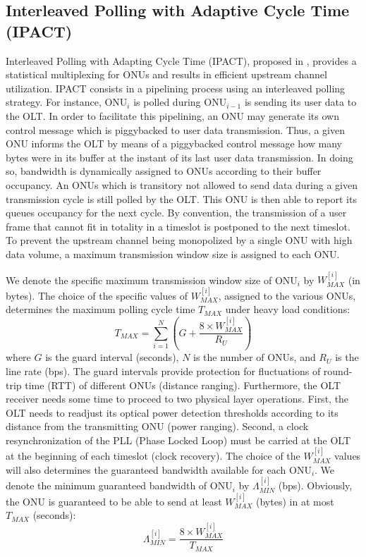 \documentclass[a4paper,10pt]{IEEEtran}
\begin{document}
\subsection{Interleaved Polling with Adaptive Cycle Time (IPACT)}
Interleaved Polling with Adapting Cycle Time (IPACT), proposed in
\cite{Kramer:IPACT}, provides a statistical multiplexing for ONUs
and results in efficient upstream channel utilization. IPACT
consists in a pipelining process using an interleaved polling
strategy. For instance, ONU$_{i}$ is polled during ONU$_{i-1}$ is
sending its user data to the OLT. In order to facilitate this
pipelining, an ONU may generate its own control message which is
piggybacked to user data transmission. Thus, a given ONU informs the
OLT by means of a piggybacked control message how many bytes were in
its buffer at the instant of its last user data transmission. In
doing so, bandwidth is dynamically assigned to ONUs according to
their buffer occupancy. An ONUs which is transitory not allowed to
send data during a given transmission cycle is still polled by the
OLT. This ONU is then able to report its queues occupancy for the
next cycle. By convention, the transmission of a user frame that
cannot fit in totality in a timeslot is postponed to the next
timeslot. To prevent the upstream channel being monopolized by a
single ONU with high data volume, a maximum transmission window size
is assigned to each ONU.

We denote the specific maximum transmission window size of ONU$_{i}$
by $W_{MAX}^{[i]}$ (in bytes). The choice of the specific values of
$W_{MAX}^{[i]}$, assigned to the various ONUs, determines the
maximum polling cycle time $T_{MAX}$ under heavy load conditions:
\begin{equation}\label{eq:tmax}
T_{MAX} = \sum_{i=1}^{N} \left(G + \frac{8 \times
W_{MAX}^{[i]}}{R_U} \right)
\end{equation}
where $G$ is the guard interval (seconds), $N$ is the number of
ONUs, and $R_{U}$ is the line rate (bps). The guard intervals
provide protection for fluctuations of round-trip time (RTT) of
different ONUs (distance ranging). Furthermore, the OLT receiver
needs some time to proceed to two physical layer operations. First,
the OLT needs to readjust its optical power detection thresholds
according to its distance from the transmitting ONU (power ranging).
Second, a clock resynchronization of the PLL (Phase Locked Loop)
must be carried at the OLT at the beginning of each timeslot (clock
recovery). The choice of the $W_{MAX}^{[i]}$ values will also
determines the guaranteed bandwidth available for each ONU$_{i}$. We
denote the minimum guaranteed bandwidth of ONU$_{i}$ by
$\Lambda_{MIN}^{[i]}$ (bps). Obviously, the ONU is guaranteed to be
able to send at least $W_{MAX}^{[i]}$ (bytes) in at most $T_{MAX}$
(seconds):
\begin{equation}\label{eq:miniband}
\Lambda_{MIN}^{[i]} = \frac{8 \times W_{MAX}^{[i]}}{T_{MAX}}
\end{equation}
\end{document}
